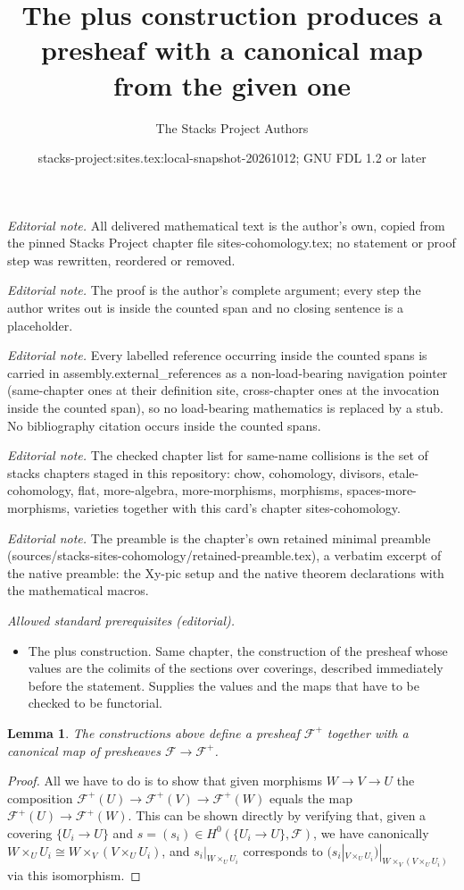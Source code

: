 \documentclass[10pt,a4paper]{amsart}
\title{The plus construction produces a presheaf with a canonical map from the given one}
\author{The Stacks Project Authors}
\date{stacks-project:sites.tex:local-snapshot-20261012; GNU FDL 1.2 or later}
\theoremstyle{plain}
\newtheorem{lemma}[subsection]{Lemma}
\theoremstyle{definition}
\theoremstyle{remark}
\numberwithin{equation}{subsection}
\begin{document}
\maketitle
\noindent\textit{Editorial note.} All delivered mathematical text is the author's own, copied from the pinned Stacks Project chapter file sites-cohomology.tex; no statement or proof step was rewritten, reordered or removed.\par\medskip
\noindent\textit{Editorial note.} The proof is the author's complete argument; every step the author writes out is inside the counted span and no closing sentence is a placeholder.\par\medskip
\noindent\textit{Editorial note.} Every labelled reference occurring inside the counted spans is carried in assembly.external\_references as a non-load-bearing navigation pointer (same-chapter ones at their definition site, cross-chapter ones at the invocation inside the counted span), so no load-bearing mathematics is replaced by a stub. No bibliography citation occurs inside the counted spans.\par\medskip
\noindent\textit{Editorial note.} The checked chapter list for same-name collisions is the set of stacks chapters staged in this repository: chow, cohomology, divisors, etale-cohomology, flat, more-algebra, more-morphisms, morphisms, spaces-more-morphisms, varieties together with this card's chapter sites-cohomology.\par\medskip
\noindent\textit{Editorial note.} The preamble is the chapter's own retained minimal preamble (sources/stacks-sites-cohomology/retained-preamble.tex), a verbatim excerpt of the native preamble: the Xy-pic setup and the native theorem declarations with the mathematical macros.\par\medskip
\noindent\textit{Allowed standard prerequisites (editorial).}\begin{itemize}
\item The plus construction. Same chapter, the construction of the presheaf whose values are the colimits of the sections over coverings, described immediately before the statement. Supplies the values and the maps that have to be checked to be functorial.
\end{itemize}\medskip
\begin{lemma}
\label{lemma-plus-presheaf}
The constructions above define a presheaf
$\mathcal{F}^+$ together with a canonical
map of presheaves $\mathcal{F} \to \mathcal{F}^+$.
\end{lemma}

\begin{proof}
All we have to do is to show that given morphisms
$W \to V \to U$ the composition $\mathcal{F}^+(U)
\to \mathcal{F}^+(V) \to \mathcal{F}^+(W)$
equals the map $\mathcal{F}^+(U) \to \mathcal{F}^+(W)$.
This can be shown directly by verifying that, given
a covering $\{U_i \to U\}$ and
$s = (s_i) \in H^0(\{U_i \to U\}, \mathcal{F})$,
we have canonically
$W \times_U U_i \cong W \times_V (V \times_U U_i)$,
and
$s_i|_{W \times_U U_i}$
corresponds to
$(s_i|_{V \times_U U_i})|_{W \times_V (V \times_U U_i)}$
via this isomorphism.
\end{proof}
\end{document}
